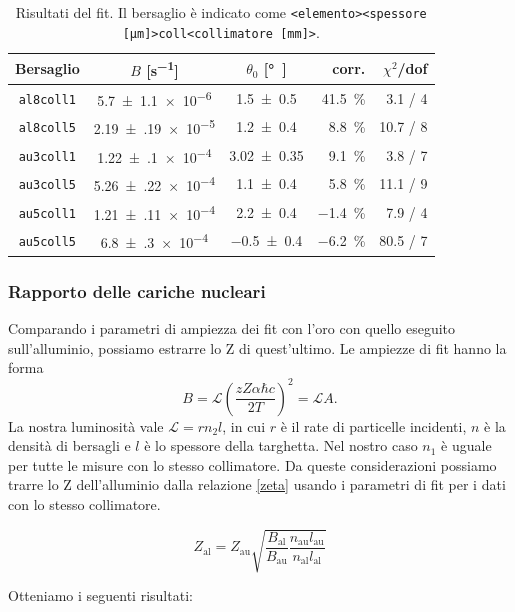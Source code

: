\begin{table}
	\centering
	\begin{tabular}{cccrr}
		Bersaglio & $B$ [\si{s^{-1}}] & $\theta_0$ [\si\degree] & corr. & $\chi^2$/dof \\
		\hline
		\texttt{al8coll1} & \num{5.7(11)e-6 } & \num{1.5 \pm 0.5  } & \SI{41.5} \% & 3.1 / 4  \\
		\texttt{al8coll5} & \num{2.19(19)e-5} & \num{1.2 \pm 0.4  } & \SI{8.8 }\%  & 10.7 / 8 \\
		\texttt{au3coll1} & \num{1.22(10)e-4} & \num{3.02 \pm 0.35} & \SI{9.1 }\%  & 3.8 / 7  \\
		\texttt{au3coll5} & \num{5.26(22)e-4} & \num{1.1 \pm 0.4  } & \SI{5.8 }\%  & 11.1 / 9 \\
		\texttt{au5coll1} & \num{1.21(11)e-4} & \num{2.2 \pm 0.4  } & \SI{-1.4} \% & 7.9 / 4  \\
		\texttt{au5coll5} & \num{6.8(3)e-4  } & \num{-0.5 \pm 0.4 } & \SI{-6.2} \% & 80.5 / 7
	\end{tabular}
	\caption{\label{tab:fit}
	Risultati del fit. Il bersaglio è indicato come
	\texttt{<elemento><spessore [\si{\micro m}]>coll<collimatore [\si{mm}]>}.}
\end{table}

\subsubsection{Rapporto delle cariche nucleari}

Comparando i parametri di ampiezza dei fit con l'oro con quello eseguito sull'alluminio, possiamo estrarre lo Z di quest'ultimo. Le ampiezze di fit hanno la forma $$ B=\mathcal{L} \left( \frac {zZ\alpha\hbar c} {2T} \right)^2 = \mathcal{L} A . $$
La nostra luminosità vale $\mathcal{L}=r n_2 l$, in cui $r$ è il rate di particelle incidenti, $n$  è la densità di bersagli e $l$ è lo spessore della targhetta.
Nel nostro caso $n_1$ è uguale per tutte le misure con lo stesso collimatore.   
Da queste considerazioni possiamo trarre lo Z dell'alluminio dalla relazione \eqref{zeta} usando i parametri di fit per i dati con lo stesso collimatore.

\begin{equation}
Z_{\text{al}}=Z_{\text{au}} \sqrt{ \frac{B_{\text{al}}}{B_{\text{au}}} \frac{n_{\text{au}} l_{\text{au}}}{n_{\text{al}} l_{\text{al}}} }
\label{zeta}
\end{equation}

Otteniamo i seguenti risultati:

